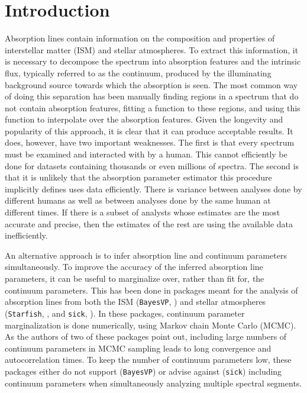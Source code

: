 \documentclass[manuscript]{aastex62}
\begin{document}
\section{Introduction}
\label{sec:introduction}
Absorption lines contain information on the composition and properties of interstellar matter (ISM) and stellar atmospheres.
To extract this information, it is necessary to decompose the spectrum into absorption features and the intrinsic flux, typically referred to as the continuum, produced by the illuminating background source towards which the absorption is seen.
The most common way of doing this separation has been manually finding regions in a spectrum that do not contain absorption features, fitting a function to these regions, and using this function to interpolate over the absorption features.
Given the longevity and popularity of this approach, it is clear that it can produce acceptable results.
It does, however, have two important weaknesses.
The first is that every spectrum must be examined and interacted with by a human.
This cannot efficiently be done for datasets containing thousands or even millions of spectra.
The second is that it is unlikely that the absorption parameter estimator this procedure implicitly defines uses data efficiently.
There is variance between analyses done by different humans as well as between analyses done by the same human at different times.
If there is a subset of analysts whose estimates are the most accurate and precise, then the estimates of the rest are using the available data inefficiently.

An alternative approach is to infer absorption line and continuum parameters simultaneously.
To improve the accuracy of the inferred absorption line parameters, it can be useful to marginalize over, rather than fit for, the continuum parameters.
This has been done in packages meant for the analysis of absorption lines from both the ISM (\texttt{BayesVP}, \citealt{Liang:2018kq}) and stellar atmospheres (\texttt{Starfish}, \citealt{2015ApJ...812..128C}, and \texttt{sick}, \citealt{2016ApJS..223....8C}).
In these packages, continuum parameter marginalization is done numerically, using Markov chain Monte Carlo (MCMC).
As the authors of two of these packages point out, including large numbers of continuum parameters in MCMC sampling leads to long convergence and autocorrelation times.
To keep the number of continuum parameters low, these packages either do not support (\texttt{BayesVP}) or advise against (\texttt{sick}) including continuum parameters when simultaneously analyzing multiple spectral segments.
\end{document}
